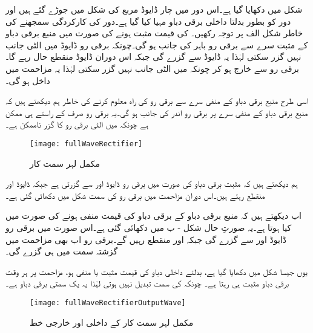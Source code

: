 

شکل  میں  دکھایا گیا ہے۔اس دور میں چار ڈایوڈ مربع کی شکل میں جوڑے گئے ہیں اور دور کو  بطور بدلتا داخلی برقی دباو مہیا کیا گیا ہے۔دور کی کارکردگی سمجھنے کی خاطر شکل  الف  پر توجہ رکھیں۔ کی قیمت مثبت ہونے کی صورت میں منبع برقی دباو کے مثبت   سرے سے برقی رو باہر کی جانب ہو گی۔چونکہ برقی رو ڈایوڈ میں الٹی جانب نہیں گزر سکتی لہٰذا یہ ڈایوڈ  سے گزرے گی جبکہ اس دوران ڈایوڈ  منقطع حال رہے گا۔برقی رو  سے خارج ہو کر چونکہ  میں الٹی جانب نہیں گزر سکتی لہٰذا یہ مزاحمت  میں داخل ہو گی۔

اسی طرح منبع برقی دباو کے منفی سرے سے برقی رو کی راہ معلوم کرنے کی خاطر ہم دیکھتے ہیں کہ منبع برقی دباو کے منفی  سرے پر برقی رو اندر کی جانب ہو گی۔یہ برقی رو صرف  کے راستے ہی ممکن ہے چونکہ  میں الٹی برقی رو کا گزر ناممکن ہے۔
\begin{figure}
\centering
\texttt{[image: fullWaveRectifier]}
\caption{مکمل لہر سمت کار}
\label{شکل_مکمل_لہر_سمت_کار}
\end{figure}
ہم دیکھتے ہیں کہ مثبت برقی دباو کی صورت میں برقی رو ڈایوڈ   اور   سے گزرتی ہے جبکہ ڈایوڈ   اور   منقطع رہتے ہیں۔اس دوران مزاحمت میں برقی رو کی سمت شکل میں دکھائی گئی ہے۔

اب دیکھتے ہیں کہ منبع برقی دباو کے برقی دباو کی قیمت منفی ہونے کی صورت میں کیا ہوتا ہے۔یہ صورتِ حال شکل  - ب میں دکھائی گئی ہے۔اس صورت میں برقی رو ڈایوڈ   اور  سے گزرے گی جبکہ   اور   منقطع رہیں گے۔برقی رو اب بھی مزاحمت میں گزشتہ سمت میں ہی گزرے گی۔

یوں جیسا شکل   میں دکھایا گیا ہے، بدلتے داخلی دباو  کی قیمت مثبت یا منفی ہو، مزاحمت پر ہر وقت برقی دباو مثبت ہی رہتا ہے۔ چونکہ  کی سمت تبدیل نہیں ہوتی لہٰذا یہ یک سمتی برقی دباو ہے۔
\begin{figure}
\centering
\texttt{[image: fullWaveRectifierOutputWave]}
\caption{مکمل لہر سمت کار کے داخلی اور خارجی خط}
\label{شکل_مکمل_لہر_سمت_کار_کے_خط}
\end{figure}

